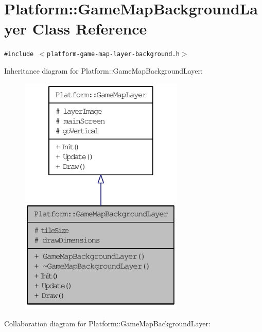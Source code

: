 \hypertarget{class_platform_1_1_game_map_background_layer}{
\section{Platform::GameMapBackgroundLayer Class Reference}
\label{df/d72/class_platform_1_1_game_map_background_layer}
}
{\tt \#include $<$platform-game-map-layer-background.h$>$}

Inheritance diagram for Platform::GameMapBackgroundLayer:\nopagebreak
\begin{figure}[H]
\begin{center}
\leavevmode
\includegraphics[width=222pt]{df/da2/class_platform_1_1_game_map_background_layer__inherit__graph}
\end{center}
\end{figure}
Collaboration diagram for Platform::GameMapBackgroundLayer:\nopagebreak
